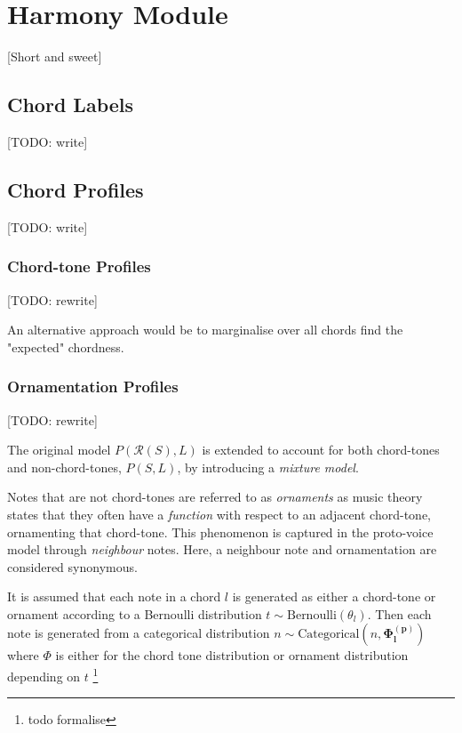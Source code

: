 \documentclass[12pt,a4paper,twoside,openany]{report} \usepackage[pdfborder={0 0 0}]{hyperref}    %
\theoremstyle{definition} \newtheorem{definition}{Definition}[section]
\begin{document}
    \section{Harmony Module}
    \label{sec:harmonyModel}
    [Short and sweet]

    \subsection{Chord Labels}
    [TODO: write]

    \subsection{Chord Profiles}
    [TODO: write]

    \subsubsection{Chord-tone Profiles}
    [TODO: rewrite]


    An alternative approach would be to marginalise over all chords find the "expected" chordness.
    \subsubsection{Ornamentation Profiles}
    [TODO: rewrite]

    The original model $P(\mathcal{R}(S),L)$ is extended to account for both
    chord-tones and non-chord-tones, $P(S,L)$, by introducing a \textit{mixture model}. 

    Notes that are not chord-tones are referred to as \textit{ornaments} as music theory 
    states that they often have a \textit{function} with respect to an adjacent chord-tone, ornamenting that chord-tone. This phenomenon is captured in the proto-voice model through
    \textit{neighbour} notes. Here, a neighbour note and ornamentation are considered synonymous. 

    It is assumed that each note in a chord $l$ is generated as either a chord-tone or ornament according to a Bernoulli
    distribution $t \sim \text{Bernoulli}(\theta_l)$. Then each note is generated from a categorical distribution $n \sim
    \text{Categorical}(n,\bm{\Phi_l^{(p)}})$ where $\Phi$ is either for the chord tone distribution or ornament
    distribution depending on $t$ \footnote{todo formalise}

\end{document}
